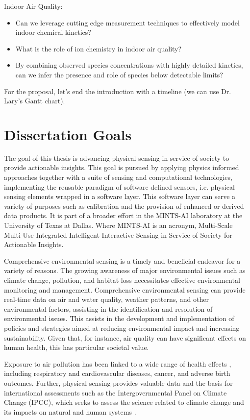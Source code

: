 Indoor Air Quality:
\begin{itemize}
\item Can we leverage cutting edge measurement techniques to effectively model indoor chemical kinetics?
\item What is the role of ion chemistry in indoor air quality?
\item By combining observed species concentrations with highly detailed kinetics, can we infer the presence and role of species below detectable limits?
\end{itemize}

For the proposal, let's end the introduction with a timeline (we can use Dr. Lary's Gantt chart).

\section{Dissertation Goals}

The goal of this thesis is advancing physical sensing in service of society to provide actionable insights. This goal is pursued by applying physics informed approaches together with a suite of sensing and computational technologies, implementing the reusable paradigm of software defined sensors, i.e. physical sensing elements wrapped in a software layer. This software layer can serve a variety of purposes such as calibration and the provision of enhanced or derived data products. It is part of a broader effort in the MINTS-AI laboratory at the University of Texas at Dallas. Where MINTS-AI is an acronym, Multi-Scale Multi-Use Integrated Intelligent Interactive Sensing in Service of Society for Actionable Insights.

Comprehensive environmental sensing is a timely and beneficial endeavor for a variety of reasons. The growing awareness of major environmental issues such as climate change, pollution, and habitat loss necessitates effective environmental monitoring and management. Comprehensive environmental sensing can provide real-time data on air and water quality, weather patterns, and other environmental factors, assisting in the identification and resolution of environmental issues. This assists in the development and implementation of policies and strategies aimed at reducing environmental impact and increasing sustainability. Given that, for instance, air quality can have significant effects on human health, this has particular societal value.

Exposure to air pollution has been linked to a wide range of health effects \cite{Brook2008, Kelly2011, Xu2017}, including respiratory and cardiovascular diseases, cancer, and adverse birth outcomes. Further, physical sensing provides valuable data and the basis for international assessments such as the Intergovernmental Panel on Climate Change (IPCC), which seeks to assess the science related to climate change and its impacts on natural and human systems \cite{IPCC1990, IPCC1995, IPCC2001, IPCC2007a, IPCC2007b, IPCC2007c, IPCC2013a, IPCC2013b, IPCC2014, IPCC2018, Friedlingstein2020, Huang2017}.

